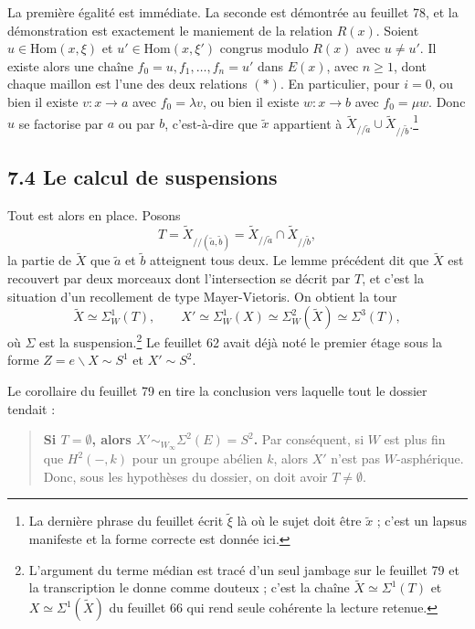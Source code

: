 \documentclass[11pt,a4paper]{article}
\begin{document}
La première égalité est immédiate. La seconde est démontrée au feuillet 78, et
la démonstration est exactement le maniement de la relation $R(x)$. Soient
$u \in \mathrm{Hom}(x,\xi)$ et $u' \in \mathrm{Hom}(x,\xi')$ congrus modulo
$R(x)$ avec $u \neq u'$. Il existe alors une chaîne
$f_{0} = u, f_{1}, \ldots, f_{n} = u'$ dans $E(x)$, avec $n \ge 1$, dont
chaque maillon est l'une des deux relations $(*)$. En particulier, pour
$i = 0$, ou bien il existe $v : x \to a$ avec $f_{0} = \lambda v$, ou bien il
existe $w : x \to b$ avec $f_{0} = \mu w$. Donc $u$ se factorise par $a$ ou
par $b$, c'est-à-dire que $\tilde x$ appartient à
$\tilde X_{/\!/\tilde a} \cup \tilde X_{/\!/\tilde b}$.\footnote{La dernière
phrase du feuillet écrit $\tilde\xi$ là où le sujet doit être $\tilde x$ ;
c'est un lapsus manifeste et la forme correcte est donnée ici.}

\subsection*{7.4 Le calcul de suspensions}

Tout est alors en place. Posons
\[
  T = \tilde X_{/\!/(\tilde a, \tilde b)}
  = \tilde X_{/\!/\tilde a} \cap \tilde X_{/\!/\tilde b},
\]
la partie de $\tilde X$ que $\tilde a$ et $\tilde b$ atteignent tous deux. Le
lemme précédent dit que $\tilde X$ est recouvert par deux morceaux dont
l'intersection se décrit par $T$, et c'est la situation d'un recollement de
type Mayer-Vietoris. On obtient la tour
\[
  \tilde X \simeq \Sigma^{1}_{W}(T), \qquad
  X' \simeq \Sigma^{1}_{W}(X) \simeq \Sigma^{2}_{W}(\tilde X)
  \simeq \Sigma^{3}(T),
\]
où $\Sigma$ est la suspension.\footnote{L'argument du terme médian est tracé
d'un seul jambage sur le feuillet 79 et la transcription le donne comme
douteux ; c'est la chaîne $\tilde X \simeq \Sigma^{1}(T)$ et
$X \simeq \Sigma^{1}(\tilde X)$ du feuillet 66 qui rend seule cohérente la
lecture retenue.} Le feuillet 62 avait déjà noté le premier étage sous la
forme $Z = e\backslash X \sim S^{1}$ et $X' \sim S^{2}$.

Le corollaire du feuillet 79 en tire la conclusion vers laquelle tout le
dossier tendait :

\begin{quote}
\textbf{Si $T = \emptyset$, alors $X' \sim_{W_{\infty}} \Sigma^{2}(E) = S^{2}$.}
Par conséquent, si $W$ est plus fin que $H^{2}(-,k)$ pour un groupe abélien
$k$, alors $X'$ n'est pas $W$-asphérique. Donc, sous les hypothèses du
dossier, on doit avoir $T \neq \emptyset$.
\end{quote}
\end{document}
